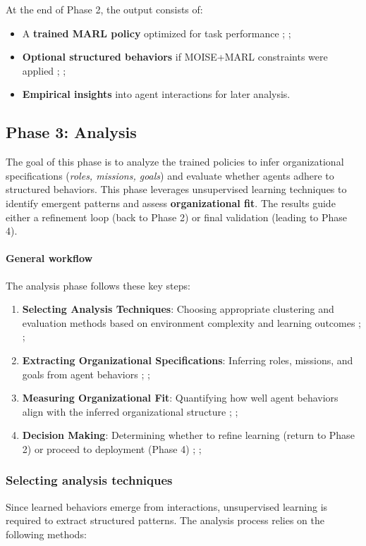 \documentclass[pdflatex,sn-mathphys-num]{sn-jnl}%
\theoremstyle{thmstyleone}%
\theoremstyle{thmstyletwo}%
\theoremstyle{thmstylethree}%
\begin{document}
At the end of Phase 2, the output consists of:
\begin{itemize}
    \item A \textbf{trained MARL policy} optimized for task performance ; ;
    \item \textbf{Optional structured behaviors} if MOISE+MARL constraints were applied ; ;
    \item \textbf{Empirical insights} into agent interactions for later analysis.
\end{itemize}

\subsection{Phase 3: Analysis}

The goal of this phase is to analyze the trained policies to infer organizational specifications (\textit{roles, missions, goals}) and evaluate whether agents adhere to structured behaviors. This phase leverages unsupervised learning techniques to identify emergent patterns and assess \textbf{organizational fit}. The results guide either a refinement loop (back to Phase 2) or final validation (leading to Phase 4).

\paragraph{\textbf{General workflow}} 
The analysis phase follows these key steps:
\begin{enumerate}
    \item \textbf{Selecting Analysis Techniques}: Choosing appropriate clustering and evaluation methods based on environment complexity and learning outcomes ; ;
    \item \textbf{Extracting Organizational Specifications}: Inferring roles, missions, and goals from agent behaviors ; ;
    \item \textbf{Measuring Organizational Fit}: Quantifying how well agent behaviors align with the inferred organizational structure ; ;
    \item \textbf{Decision Making}: Determining whether to refine learning (return to Phase 2) or proceed to deployment (Phase 4) ; ;
\end{enumerate}

\subsubsection{Selecting analysis techniques}
Since learned behaviors emerge from interactions, unsupervised learning is required to extract structured patterns. The analysis process relies on the following methods:
\end{document}
